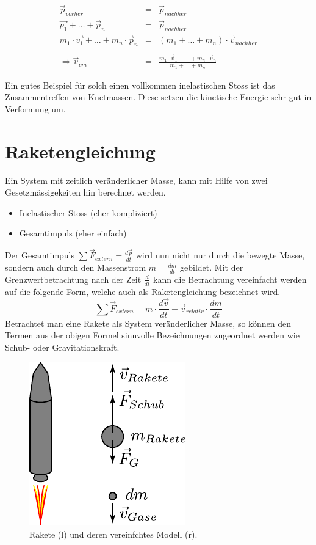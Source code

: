 \[ \boxed{
	\begin{array}{rcl}
		\vec{p}_{vorher} &= & \vec{p}_{nachher} \\
		\vec{p_1} + \dots + \vec{p}_n &= &\vec{p}_{nachher} \\
		m_1 \cdot \vec{v_1} + \dots + m_n \cdot \vec{p}_n&= 
			& (m_1 + \dots + m_n)\cdot \vec{v}_{nachher} \\
		 & & \\
		\Rightarrow \vec{v}_{cm} & = & \displaystyle 
			\frac{m_1\cdot\vec{v}_1+\dots+m_n\cdot\vec{v}_n}
				{m_1 + \dots + m_n}
	\end{array}
} \]

\noindent
Ein gutes Beispiel für solch einen vollkommen inelastischen Stoss ist
das Zusammentreffen von Knetmassen. Diese setzen die kinetische Energie
sehr gut in Verformung um.

\section{Raketengleichung}\label{sec:raketengleichung}
Ein System mit zeitlich veränderlicher Masse, kann mit Hilfe von zwei
Gesetzmässigekeiten hin berechnet werden.
\begin{itemize}
	\item Inelastischer Stoss (eher kompliziert)
	\item Gesamtimpuls (eher einfach)
\end{itemize}
Der Gesamtimpuls $\sum \vec{F}_{extern} = \frac{d\vec{p}}{dt}$ wird nun
nicht nur durch die bewegte Masse, sondern auch durch den Massenstrom 
$\dot{m}=\frac{dm}{dt}$ gebildet. 
Mit der Grenzwertbetrachtung nach der Zeit $\frac{d}{dt}$ kann die
Betrachtung vereinfacht werden auf die folgende Form, welche auch
als Raketengleichung bezeichnet wird.
\[  \boxed{
	\sum \vec{F}_{extern} 
		= m \cdot \frac{d\vec{v}}{dt} 
		- \vec{v}_{relativ} \cdot \frac{dm}{dt}
	} \]
Betrachtet man eine Rakete als System veränderlicher Masse, so können 
den Termen aus der obigen Formel sinnvolle Bezeichnungen zugeordnet 
werden wie Schub- oder Gravitationskraft.
\begin{figure}[h!]
	\centering
	\includegraphics[scale=0.8]{../fig/rakete.pdf}
	\caption{Rakete (l) und deren vereinfchtes Modell (r).}
	\label{fig:rakete}
\end{figure}

